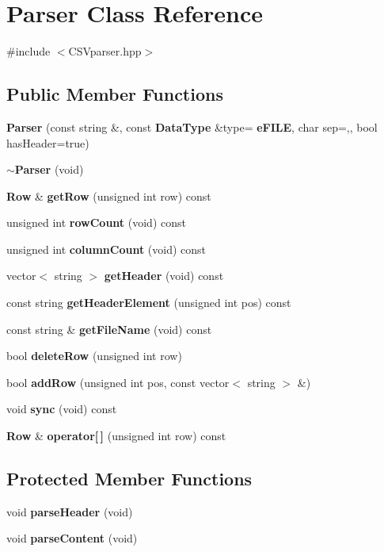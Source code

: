 \section{Parser Class Reference}
\label{class_parser}


{\ttfamily \#include $<$C\+S\+Vparser.\+hpp$>$}

\subsection*{Public Member Functions}
\begin{DoxyCompactItemize}
\item 
\textbf{ Parser} (const string \&, const \textbf{ Data\+Type} \&type=\textbf{ e\+F\+I\+LE}, char sep=\textquotesingle{},\textquotesingle{}, bool has\+Header=true)
\item 
\textbf{ $\sim$\+Parser} (void)
\item 
\textbf{ Row} \& \textbf{ get\+Row} (unsigned int row) const
\item 
unsigned int \textbf{ row\+Count} (void) const
\item 
unsigned int \textbf{ column\+Count} (void) const
\item 
vector$<$ string $>$ \textbf{ get\+Header} (void) const
\item 
const string \textbf{ get\+Header\+Element} (unsigned int pos) const
\item 
const string \& \textbf{ get\+File\+Name} (void) const
\item 
bool \textbf{ delete\+Row} (unsigned int row)
\item 
bool \textbf{ add\+Row} (unsigned int pos, const vector$<$ string $>$ \&)
\item 
void \textbf{ sync} (void) const
\item 
\textbf{ Row} \& \textbf{ operator[$\,$]} (unsigned int row) const
\end{DoxyCompactItemize}
\subsection*{Protected Member Functions}
\begin{DoxyCompactItemize}
\item 
void \textbf{ parse\+Header} (void)
\item 
void \textbf{ parse\+Content} (void)
\end{DoxyCompactItemize}
